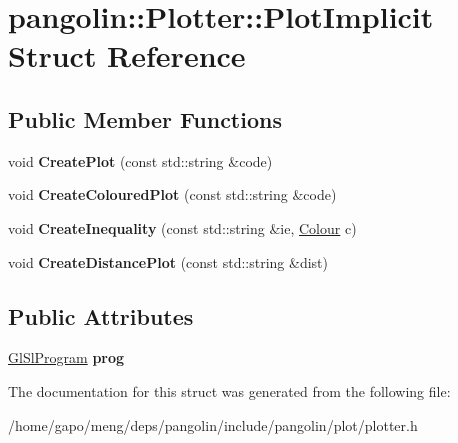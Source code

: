 \hypertarget{structpangolin_1_1_plotter_1_1_plot_implicit}{}\section{pangolin\+:\+:Plotter\+:\+:Plot\+Implicit Struct Reference}
\label{structpangolin_1_1_plotter_1_1_plot_implicit}
\subsection*{Public Member Functions}
\begin{DoxyCompactItemize}
\item 
void {\bfseries Create\+Plot} (const std\+::string \&code)\hypertarget{structpangolin_1_1_plotter_1_1_plot_implicit_a8fe873d5c02f53918e6701fe42143c2a}{}\label{structpangolin_1_1_plotter_1_1_plot_implicit_a8fe873d5c02f53918e6701fe42143c2a}

\item 
void {\bfseries Create\+Coloured\+Plot} (const std\+::string \&code)\hypertarget{structpangolin_1_1_plotter_1_1_plot_implicit_a8cd8860e9b38a349da94e281b7d48ad9}{}\label{structpangolin_1_1_plotter_1_1_plot_implicit_a8cd8860e9b38a349da94e281b7d48ad9}

\item 
void {\bfseries Create\+Inequality} (const std\+::string \&ie, \hyperlink{structpangolin_1_1_colour}{Colour} c)\hypertarget{structpangolin_1_1_plotter_1_1_plot_implicit_ad667885ee92a5458874f01784b61796c}{}\label{structpangolin_1_1_plotter_1_1_plot_implicit_ad667885ee92a5458874f01784b61796c}

\item 
void {\bfseries Create\+Distance\+Plot} (const std\+::string \&dist)\hypertarget{structpangolin_1_1_plotter_1_1_plot_implicit_a5d206dc4f3c2ac5fffeecdc505e22d13}{}\label{structpangolin_1_1_plotter_1_1_plot_implicit_a5d206dc4f3c2ac5fffeecdc505e22d13}

\end{DoxyCompactItemize}
\subsection*{Public Attributes}
\begin{DoxyCompactItemize}
\item 
\hyperlink{classpangolin_1_1_gl_sl_program}{Gl\+Sl\+Program} {\bfseries prog}\hypertarget{structpangolin_1_1_plotter_1_1_plot_implicit_a4880a9c7a401c34ba55beb8d76916548}{}\label{structpangolin_1_1_plotter_1_1_plot_implicit_a4880a9c7a401c34ba55beb8d76916548}

\end{DoxyCompactItemize}


The documentation for this struct was generated from the following file\+:\begin{DoxyCompactItemize}
\item 
/home/gapo/meng/deps/pangolin/include/pangolin/plot/plotter.\+h\end{DoxyCompactItemize}
